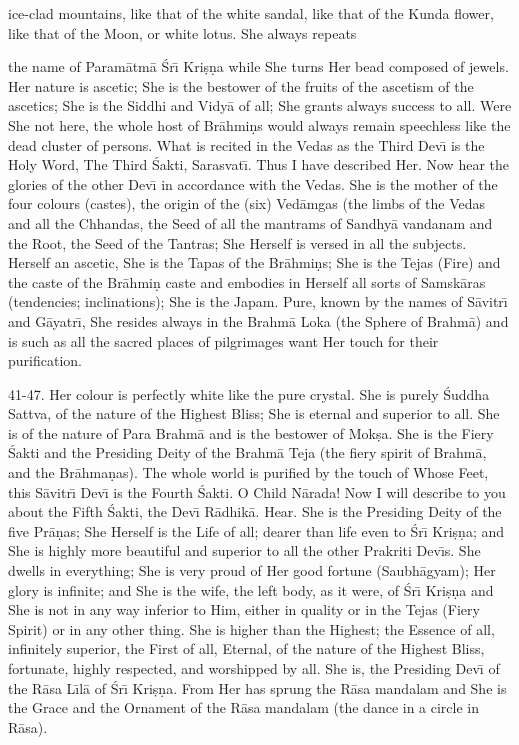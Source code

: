 ice-clad mountains, like that of the white sandal, like that of the Kunda flower, like that of the Moon, or white lotus. She always repeats

the name of Param\=atm\=a \'Sr\={\i} Kri\d{s}\d{n}a while She turns Her bead composed of jewels. Her nature is ascetic; She is the bestower of the fruits of the ascetism of the ascetics; She is the Siddhi and Vidy\=a of all; She grants always success to all. Were She not here, the whole host of Br\=ahmi\d{n}s would always remain speechless like the dead cluster of persons. What is recited in the Vedas as the Third Dev\={\i} is the Holy Word, The Third \'Sakti, Sarasvat\={\i}. Thus I have described Her. Now hear the glories of the other Dev\={\i} in accordance with the Vedas. She is the mother of the four colours (castes), the origin of the (six) Ved\=amgas (the limbs of the Vedas and all the Chhandas, the Seed of all the mantrams of Sandhy\=a vandanam and the Root, the Seed of the Tantras; She Herself is versed in all the subjects. Herself an ascetic, She is the Tapas of the Br\=ahmi\d{n}s; She is the Tejas (Fire) and the caste of the Br\=ahmi\d{n} caste and embodies in Herself all sorts of Samsk\=aras (tendencies; inclinations); She is the Japam. Pure, known by the names of S\=avitr\={\i} and G\=ayatr\={\i}, She resides always in the Brahm\=a Loka (the Sphere of Brahm\=a) and is such as all the sacred places of pilgrimages want Her touch for their purification.

41-47. Her colour is perfectly white like the pure crystal. She is purely \'Suddha Sattva, of the nature of the Highest Bliss; She is eternal and superior to all. She is of the nature of Para Brahm\=a and is the bestower of Mok\d{s}a. She is the Fiery \'Sakti and the Presiding Deity of the Brahm\=a Teja (the fiery spirit of Brahm\=a, and the Br\=ahma\d{n}as). The whole world is purified by the touch of Whose Feet, this S\=avitr\={\i} Dev\={\i} is the Fourth \'Sakti. O Child N\=arada! Now I will describe to you about the Fifth \'Sakti, the Dev\={\i} R\=adhik\=a. Hear. She is the Presiding Deity of the five Pr\=a\d{n}as; She Herself is the Life of all; dearer than life even to \'Sr\={\i} Kri\d{s}\d{n}a; and She is highly more beautiful and superior to all the other Prakriti Dev\={\i}s. She dwells in everything; She is very proud of Her good fortune (Saubh\=agyam); Her glory is infinite; and She is the wife, the left body, as it were, of \'Sr\={\i} Kri\d{s}\d{n}a and She is not in any way inferior to Him, either in quality or in the Tejas (Fiery Spirit) or in any other thing. She is higher than the Highest; the Essence of all, infinitely superior, the First of all, Eternal, of the nature of the Highest Bliss, fortunate, highly respected, and worshipped by all. She is, the Presiding Dev\={\i} of the R\=asa L\={\i}l\=a of \'Sr\={\i} Kri\d{s}\d{n}a. From Her has sprung the R\=asa mandalam and She is the Grace and the Ornament of the R\=asa mandalam (the dance in a circle in R\=asa).

